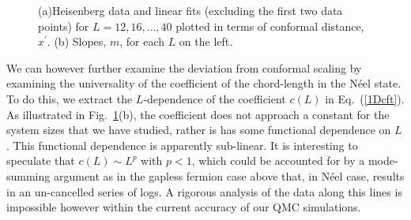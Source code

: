 \documentclass[prl,aps,twocolumn,floatfix,amsmath,amssymb,superscriptaddress,tightenlines]{revtex4}
\begin{document}
 \begin{figure}
   \begin{center}
   \end{center}
   \caption{(a)Heisenberg data and linear fits (excluding the first two data points) for $L=12,16,\dots,40$ plotted in terms of conformal distance, $x^\prime$.
   (b) Slopes, $m$, for each $L$ on the left. 
   }
   \label{fig:heis_lines}
 \end{figure}

We can however further examine the deviation from conformal scaling by examining the universality of the 
coefficient of the chord-length in the N\'eel state.
To do this, we extract the $L$-dependence of the coefficient $c(L)$ in Eq.~(\ref{1Dcft}).  As illustrated in Fig.~\ref{fig:heis_lines}(b),
the coefficient does not approach a constant for the system sizes that we have studied, rather is has some functional dependence on $L$.
This functional dependence is apparently sub-linear.  It is interesting to speculate that $c(L) \sim L^p$ with $p<1$,
which could be accounted for by a mode-summing argument as in the gapless fermion case above that, in N\'eel case, 
results in an un-cancelled series of logs.  A rigorous analysis of the data along this lines is impossible however within the current
accuracy of our QMC simulations.

\end{document}
